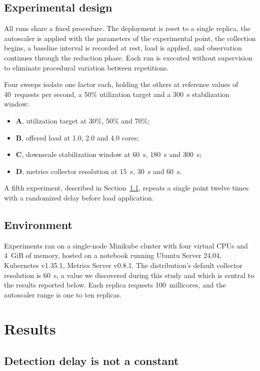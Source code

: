 \documentclass[conference]{IEEEtran}
\begin{document}
\subsection{Experimental design}

All runs share a fixed procedure. The deployment is reset to a single replica,
the autoscaler is applied with the parameters of the experimental point, the
collection begins, a baseline interval is recorded at rest, load is applied,
and observation continues through the reduction phase. Each run is executed
without supervision to eliminate procedural variation between repetitions.

Four sweeps isolate one factor each, holding the others at reference values of
40~requests per second, a 50\% utilization target and a 300~s stabilization
window:

\begin{itemize}
\item \textbf{A}, utilization target at 30\%, 50\% and 70\%;
\item \textbf{B}, offered load at 1.0, 2.0 and 4.0 cores;
\item \textbf{C}, downscale stabilization window at 60~s, 180~s and 300~s;
\item \textbf{D}, metrics collector resolution at 15~s, 30~s and 60~s.
\end{itemize}

A fifth experiment, described in Section~\ref{sec:phase}, repeats a single point
twelve times with a randomized delay before load application.

\subsection{Environment}

Experiments ran on a single-node Minikube cluster with four virtual CPUs and
4~GiB of memory, hosted on a notebook running Ubuntu Server 24.04, Kubernetes
v1.35.1, Metrics Server v0.8.1. The distribution's default collector resolution
is 60~s, a value we discovered during this study and which is central to the
results reported below. Each replica requests 100~millicores, and the autoscaler
range is one to ten replicas.

\section{Results}

\subsection{Detection delay is not a constant}
\label{sec:phase}
\end{document}
